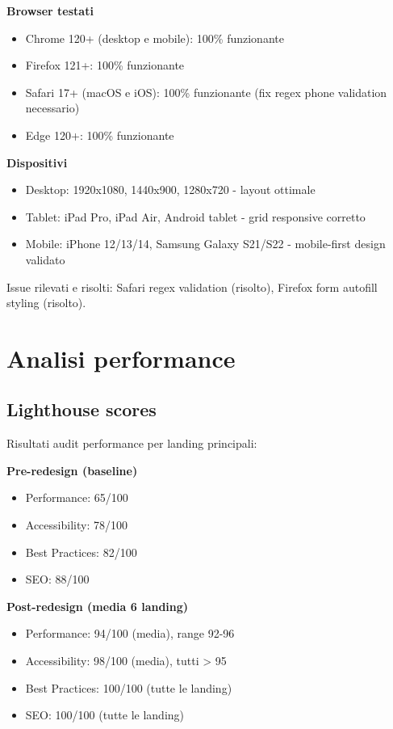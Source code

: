 \textbf{Browser testati}
\begin{itemize}
  \item Chrome 120+ (desktop e mobile): 100\% funzionante
  \item Firefox 121+: 100\% funzionante
  \item Safari 17+ (macOS e iOS): 100\% funzionante (fix regex phone 
        validation necessario)
  \item Edge 120+: 100\% funzionante
\end{itemize}

\textbf{Dispositivi}
\begin{itemize}
  \item Desktop: 1920x1080, 1440x900, 1280x720 - layout ottimale
  \item Tablet: iPad Pro, iPad Air, Android tablet - grid responsive 
        corretto
  \item Mobile: iPhone 12/13/14, Samsung Galaxy S21/S22 - mobile-first 
        design validato
\end{itemize}

Issue rilevati e risolti: Safari regex validation (risolto), Firefox 
form autofill styling (risolto).

\section{Analisi performance}
\subsection{Lighthouse scores}
Risultati audit performance per landing principali:

\textbf{Pre-redesign (baseline)}
\begin{itemize}
  \item Performance: 65/100
  \item Accessibility: 78/100
  \item Best Practices: 82/100
  \item SEO: 88/100
\end{itemize}

\textbf{Post-redesign (media 6 landing)}
\begin{itemize}
  \item Performance: 94/100 (media), range 92-96
  \item Accessibility: 98/100 (media), tutti > 95
  \item Best Practices: 100/100 (tutte le landing)
  \item SEO: 100/100 (tutte le landing)
\end{itemize}

